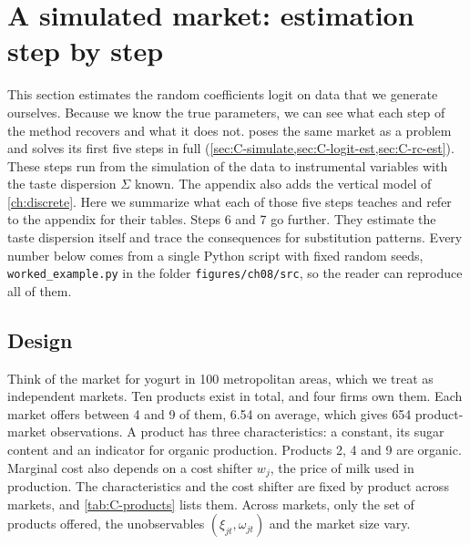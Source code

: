 \section{A simulated market: estimation step by step}\label{sec:08-worked}

This section estimates the random coefficients logit on data that we generate ourselves. Because we know the true
parameters, we can see what each step of the method recovers and what it does not.  poses the same
market as a problem and solves its first five steps in full (\cref{sec:C-simulate,sec:C-logit-est,sec:C-rc-est}).
These steps run from the simulation of the data to instrumental variables with the taste dispersion $\Sigma$ known. The
appendix also adds the vertical model of \cref{ch:discrete}. Here we summarize what each of those five steps teaches and refer to the appendix for their
tables. Steps 6 and 7 go further. They estimate the taste dispersion itself and trace the consequences for substitution
patterns. Every number below comes from a single Python script with fixed random seeds, \texttt{worked\_example.py} in
the folder \texttt{figures/ch08/src}, so the reader can reproduce all of them.

\subsection{Design}\label{sec:08-worked-design}

Think of the market for yogurt in 100 metropolitan areas, which we treat as independent markets. Ten products exist in
total, and four firms own them. Each market offers between 4 and 9 of them, 6.54 on average, which gives 654
product-market observations. A product has three characteristics: a constant, its sugar content and an indicator for
organic production. Products 2, 4 and 9 are organic. Marginal cost also depends on a cost shifter $w_j$, the price of
milk used in production. The characteristics and the cost shifter are fixed by product across markets, and
\cref{tab:C-products} lists them. Across markets, only the set of products offered, the unobservables $(\xi_{jt},
\omega_{jt})$ and the market size vary.

